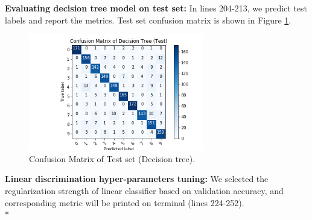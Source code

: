\documentclass[12pt]{article}
\begin{document}
\textbf{Evaluating decision tree model on test set:} In lines 204-213, we predict test labels and report the metrics. Test set confusion matrix is shown in Figure \ref{fig:dtreetest}.
\begin{figure}[h] 
	\begin{center}
		\includegraphics[width=3in]{dtreetest.png}
		\caption{Confusion Matrix of Test set (Decision tree).}
		\label{fig:dtreetest}
	\end{center}
\end{figure} 
\newpage
\textbf{Linear discrimination hyper-parameters tuning:} We selected the regularization strength of linear classifier based on validation accuracy, and corresponding metric will be printed on terminal (lines 224-252).\\*
\end{document}
